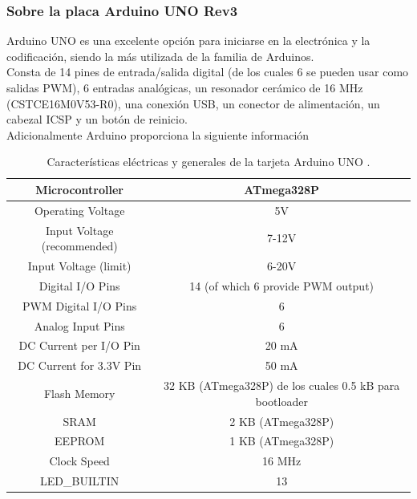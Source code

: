 \subsubsection{Sobre la placa Arduino UNO Rev3}
Arduino UNO es una excelente opción para iniciarse en la electrónica y la codificación, siendo la más utilizada de la familia de Arduinos.\\
Consta de 14 pines de entrada/salida digital (de los cuales 6 se pueden usar como salidas PWM), 6 entradas analógicas, un resonador cerámico de 16 MHz (CSTCE16M0V53-R0), una conexión USB, un conector de alimentación, un cabezal ICSP y un botón de reinicio. \cite{arduino}\\
Adicionalmente Arduino proporciona la siguiente información
\begin{table}[H]
\centering
\begin{tabular}{|c|c|}
\hline
Microcontroller   & {ATmega328P}               \\ \hline
Operating Voltage           & 5V                                                    \\ \hline
Input Voltage (recommended) & 7-12V                                                 \\ \hline
Input Voltage (limit)       & 6-20V                                                 \\ \hline
Digital I/O Pins            & 14 (of which 6 provide PWM output)                    \\ \hline
PWM Digital I/O Pins        & 6                                                     \\ \hline
Analog Input Pins           & 6                                                     \\ \hline
DC Current per I/O Pin      & 20 mA                                                 \\ \hline
DC Current for 3.3V Pin     & 50 mA                                                 \\ \hline
Flash Memory                & 32 KB (ATmega328P) de los cuales 0.5 kB para bootloader \\ \hline
SRAM                        & 2 KB (ATmega328P)                                     \\ \hline
EEPROM                      & 1 KB (ATmega328P)                                     \\ \hline
Clock Speed                 & 16 MHz                                                \\ \hline
LED\_BUILTIN                & 13                                                    \\ \hline

\end{tabular}
\caption{Características eléctricas y generales de la tarjeta Arduino UNO \cite{arduino}.}
\label{t1}
\end{table}



